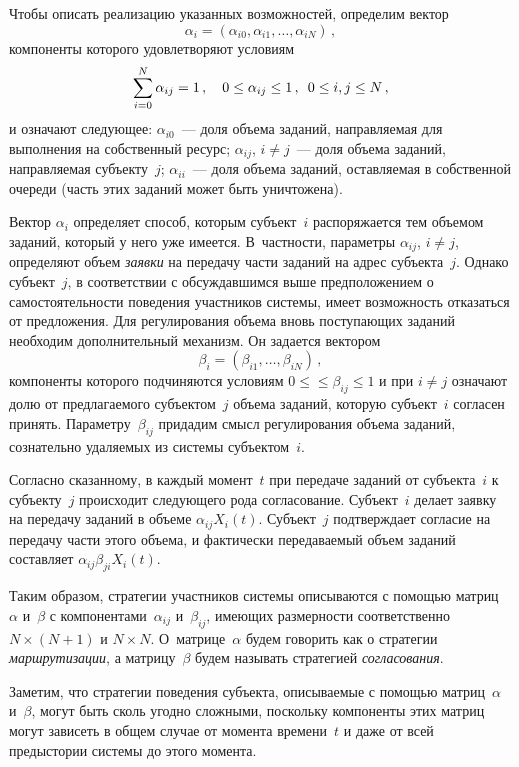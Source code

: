 \begin{multicols}{2}
  Чтобы описать реализацию указанных возможностей, определим вектор
  $$
  \alpha_i = \left( \alpha_{i0},\alpha_{i1},\ldots ,\alpha_{iN}\right)\,,
  $$
компоненты которого удовлетворяют условиям
$$
\sum\limits_{i=0}^N \alpha_{ij} =1\,,\quad 0\leq \alpha_{ij}\leq1\,,\enskip 0\leq i,j\leq N\,,
$$
и означают следующее:
  $\alpha_{i0}$~--- доля объема заданий, направляемая для выполнения на собственный 
ресурс; $\alpha_{ij}$, $i\not=j$~--- доля объема заданий, направляемая субъекту~$j$; 
$\alpha_{ii}$~--- доля объема заданий, остав\-ля\-емая в собственной очереди (часть этих 
заданий может быть уничтожена).
  
  Вектор $\alpha_i$ определяет способ, которым субъект~$i$ распоряжается тем объемом 
заданий, который у него уже имеется. В~частности, параметры $\alpha_{ij}$, $i\not= j$,
определяют объем \textit{заявки} на передачу части заданий на адрес субъекта~$j$. Однако 
субъект~$j$, в соответствии с обсуждавшимся выше предположением о самостоятельности 
поведения участников системы, имеет возможность отказаться от предложения. Для 
регулирования объема вновь поступающих заданий необходим дополнительный механизм. 
Он задается вектором
  $$
  \beta_i =\left ( \beta_{i1},\ldots , \beta_{iN}\right)\,,
  $$
компоненты которого подчиняются условиям $0\leq$\linebreak $\leq \beta_{ij}\leq 1$ и при 
$i\not=  j$ означают долю от пред\-ла\-га\-емо\-го субъектом~$j$ объема заданий, которую субъект~$i$ согласен 
принять. Параметру~$\beta_{ij}$ придадим смысл регулирования объема заданий, 
сознательно удаляемых из системы субъектом~$i$.
  
  Согласно сказанному, в каждый момент~$t$ при передаче заданий от субъекта~$i$ к 
субъекту~$j$ происходит следующего рода согласование. Субъект~$i$ делает заявку на 
передачу заданий в объеме $\alpha_{ij}X_i(t)$. Субъект~$j$ подтверждает согласие на 
передачу части этого объема, и фактически передаваемый объем заданий составляет 
$\alpha_{ij}\beta_{ji}X_i(t)$.
  
  Таким образом, стратегии участников системы описываются с помощью матриц~$\alpha$ 
и~$\beta$ с компонентами~$\alpha_{ij}$ и~$\beta_{ij}$, имеющих размерности 
соответственно $N\times (N+1)$ и $N\times N$. О~матрице~$\alpha$ будем говорить как о 
стратегии \textit{маршрутизации}, а матрицу~$\beta$ будем называть стратегией 
\textit{согласования}.
  
  Заметим, что стратегии поведения субъекта, описываемые с помощью матриц~$\alpha$ 
и~$\beta$, могут быть сколь угодно сложными, поскольку компоненты этих матриц могут 
зависеть в общем случае от момента времени~$t$ и даже от всей предыстории системы до 
этого момента.
  

\end{multicols}
